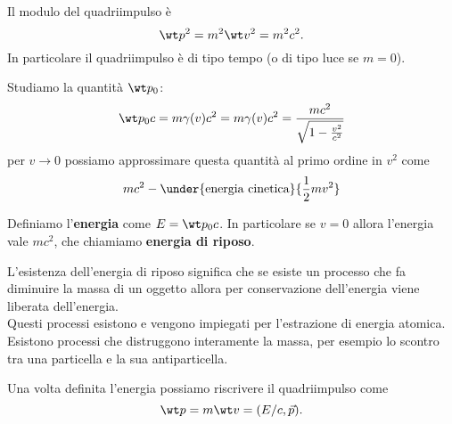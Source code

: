 \begin{remark}
Il modulo del quadriimpulso \`e
\[\wt p^2=m^2\wt v^2=m^2c^2.\]
In particolare il quadriimpulso \`e di tipo tempo (o di tipo luce se $m=0$).
\end{remark}

\noindent
Studiamo la quantit\`a $\wt p_0$:
\[\wt p_0c=m\gamma(v)c^2=m\gamma(v)c^2=\frac{mc^2}{\sqrt{1-\frac{v^2}{c^2}}}\]
per $v\to 0$ possiamo approssimare questa quantit\`a al primo ordine in $v^2$ come
\[mc^2-\under{\text{energia cinetica}}{\frac12 mv^2}\]

\begin{definition}[Energia]
Definiamo l'\textbf{energia} come $E=\wt p_0c$. In particolare se $v=0$ allora l'energia vale $mc^2$, che chiamiamo \textbf{energia di riposo}.
\end{definition}

\begin{remark}
L'esistenza dell'energia di riposo significa che se esiste un processo che fa diminuire la massa di un oggetto allora per conservazione dell'energia viene liberata dell'energia.\\
Questi processi esistono e vengono impiegati per l'estrazione di energia atomica.\\
Esistono processi che distruggono interamente la massa, per esempio lo scontro tra una particella e la sua antiparticella.
\end{remark}

\begin{remark}
Una volta definita l'energia possiamo riscrivere il quadriimpulso come
\[\wt p=m\wt v=(E/c,\vec p).\]
\end{remark}